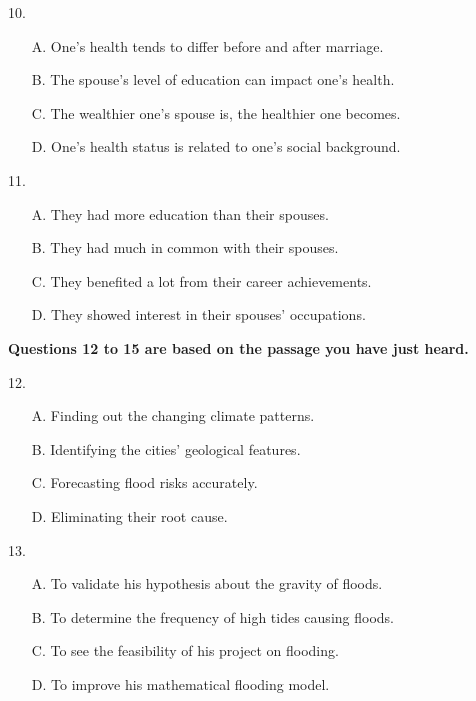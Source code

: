 \documentclass[UTF8,11pt]{ctexart}
\begin{document}
10.


\begin{itemize}[leftmargin=2em,itemsep=.2em,topsep=.4em]\item[A.] One’s health tends to differ before and after marriage.
\item[B.] The spouse’s level of education can impact one’s health.
\item[C.] The wealthier one’s spouse is, the healthier one becomes.
\item[D.] One’s health status is related to one’s social background.
\end{itemize}

11.


\begin{itemize}[leftmargin=2em,itemsep=.2em,topsep=.4em]\item[A.] They had more education than their spouses.
\item[B.] They had much in common with their spouses.
\item[C.] They benefited a lot from their career achievements.
\item[D.] They showed interest in their spouses’ occupations.
\end{itemize}

\textbf{Questions 12 to 15 are based on the passage you have just heard.}


12.


\begin{itemize}[leftmargin=2em,itemsep=.2em,topsep=.4em]\item[A.] Finding out the changing climate patterns.
\item[B.] Identifying the cities’ geological features.
\item[C.] Forecasting flood risks accurately.
\item[D.] Eliminating their root cause.
\end{itemize}

13.


\begin{itemize}[leftmargin=2em,itemsep=.2em,topsep=.4em]\item[A.] To validate his hypothesis about the gravity of floods.
\item[B.] To determine the frequency of high tides causing floods.
\item[C.] To see the feasibility of his project on flooding.
\item[D.] To improve his mathematical flooding model.
\end{itemize}
\end{document}
